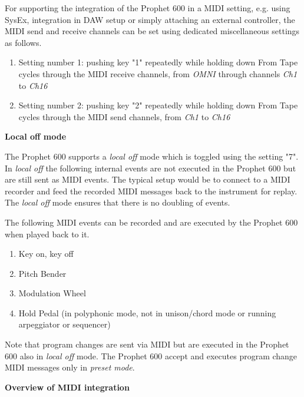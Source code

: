 For supporting the integration of the Prophet 600 in a MIDI setting, e.g. using SysEx, integration in DAW setup or simply attaching an external controller, the MIDI send and receive channels can be set using dedicated miscellaneous settings as follows.

\begin{enumerate}
  \setlength\itemsep{0cm}
  \item Setting number 1: pushing key "1" repeatedly while holding down From Tape cycles through the MIDI receive channels, from \textit{OMNI} through channels \textit{Ch1} to \textit{Ch16}
  \item Setting number 2: pushing key "2" repeatedly while holding down From Tape cycles through the MIDI send channels, from \textit{Ch1} to \textit{Ch16}
\end{enumerate}


\textbf{Local off mode}

The Prophet 600 supports a \textit{local off} mode which is toggled using the setting "7". In \textit{local off} the following internal events are not executed in the Prophet 600 but are still sent as MIDI events. The typical setup would be to connect to a MIDI recorder and feed the recorded MIDI messages back to the instrument for replay. The \textit{local off} mode ensures that there is no doubling of events.

The following MIDI events can be recorded and are executed by the Prophet 600 when played back to it.

\begin{enumerate}
  \setlength\itemsep{0cm}
  \item Key on, key off
  \item Pitch Bender
  \item Modulation Wheel
  \item Hold Pedal (in polyphonic mode, not in unison/chord mode or running arpeggiator or sequencer)
\end{enumerate}

Note that program changes are sent via MIDI but are executed in the Prophet 600 also in \textit{local off} mode. The Prophet 600 accept and executes program change MIDI messages only in \textit{preset mode}.  

\textbf{Overview of MIDI integration}

